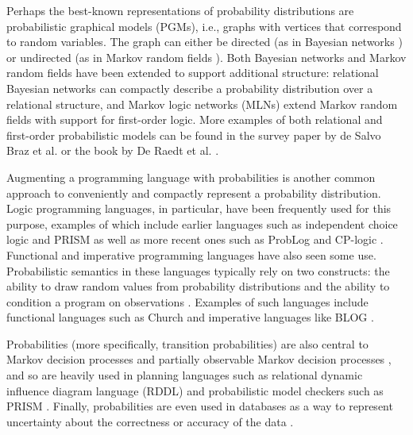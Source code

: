 \documentclass{article}
\begin{document}
Perhaps the best-known representations of probability distributions are
probabilistic graphical models (PGMs), i.e., graphs with vertices that
correspond to random variables. The graph can either be directed (as in Bayesian
networks \cite{DBLP:books/daglib/0066829}) or undirected (as in Markov random
fields \cite{spitzer1971markov}). Both Bayesian networks and Markov random
fields have been extended to support additional structure: relational Bayesian
networks \cite{DBLP:conf/uai/Jaeger97} can compactly describe a probability
distribution over a relational structure, and Markov logic networks (MLNs)
\cite{DBLP:journals/ml/RichardsonD06} extend Markov random fields with support
for first-order logic. More examples of both relational and first-order
probabilistic models can be found in the survey paper by de Salvo Braz et al.
\cite{DBLP:series/sci/BrazAR08} or the book by De Raedt et al.
\cite{DBLP:series/synthesis/2016Raedt}.

Augmenting a programming language with probabilities is another common approach
to conveniently and compactly represent a probability distribution. Logic
programming languages, in particular, have been frequently used for this
purpose, examples of which include earlier languages such as independent choice
logic \cite{DBLP:journals/ai/Poole97} and PRISM \cite{DBLP:conf/ijcai/SatoK97}
as well as more recent ones such as ProbLog \cite{DBLP:conf/ijcai/RaedtKT07} and
CP-logic \cite{DBLP:journals/tplp/VennekensDB09}. Functional and imperative
programming languages have also seen some use. Probabilistic semantics in these
languages typically rely on two constructs: the ability to draw random values
from probability distributions and the ability to condition a program on
observations \cite{DBLP:conf/icse/GordonHNR14}. Examples of such languages
include functional languages such as Church \cite{DBLP:conf/uai/GoodmanMRBT08}
and imperative languages like BLOG \cite{DBLP:conf/ijcai/MilchMRSOK05}.

Probabilities (more specifically, transition probabilities) are also central to
Markov decision processes \cite{bellman1957markovian} and partially observable
Markov decision processes \cite{aastrom1965optimal}, and so are heavily used in
planning languages such as relational dynamic influence diagram language (RDDL)
\cite{sanner2010relational} and probabilistic model checkers such as PRISM
\cite{DBLP:conf/cav/KwiatkowskaNP11}. Finally, probabilities are even used in
databases as a way to represent uncertainty about the correctness or accuracy of
the data \cite{DBLP:series/synthesis/2011Suciu}.
\end{document}
